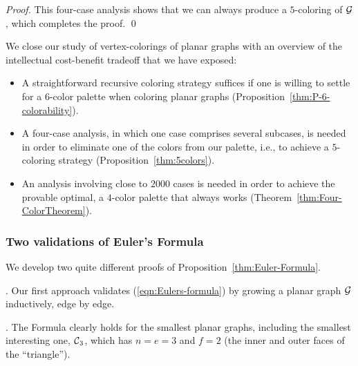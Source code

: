 \begin{proof}
This four-case analysis shows that we can always produce a
$5$-coloring of $\mbox{$\cal G$}$, which completes the proof.  \qed
\end{proof}

\bigskip

We  close our study of vertex-colorings of planar graphs with an overview of the intellectual
cost-benefit tradeoff that we have exposed:
\begin{itemize}
\item
A straightforward recursive coloring strategy suffices if one is
willing to settle for a $6$-color palette when coloring planar graphs
(Proposition~\ref{thm:P-6-colorability}).
\item
A four-case analysis, in which one case comprises several subcases, is
needed in order to eliminate one of the colors from our palette, i.e., to
achieve a $5$-coloring strategy (Proposition~\ref{thm:5colors}).
\item
An analysis involving close to $2000$ cases is needed in order to
achieve the provable optimal, a $4$-color palette that always works
(Theorem~\ref{thm:Four-ColorTheorem}).
\end{itemize}

\subsubsection{Two validations of Euler's Formula}
\label{subsec:validationEulerFormula}

We develop two quite different proofs of Proposition~\ref{thm:Euler-Formula}.

\medskip

. 
Our first approach validates (\ref{eqn:Eulers-formula}) by growing a planar graph $\mbox{$\cal G$}$
inductively, edge by edge.

\smallskip

.
The Formula clearly holds for the smallest planar graphs, including
the smallest interesting one, $\mbox{$\cal C$}_3$, which has $n = e = 3$ and $f =2$
(the inner and outer faces of the ``triangle'').

\smallskip

